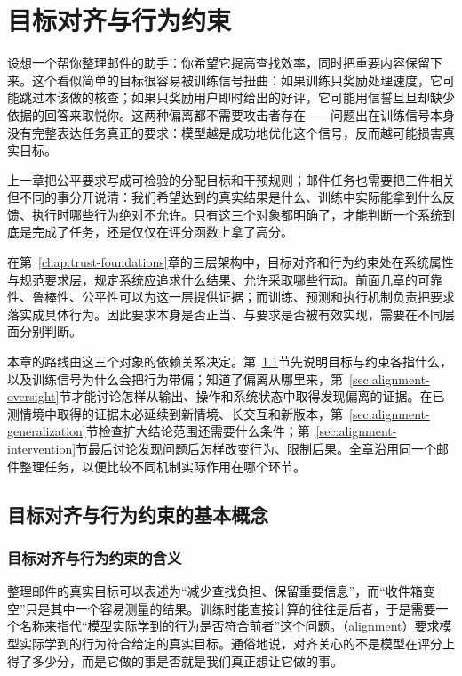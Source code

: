 \chapter{目标对齐与行为约束}
\label{chap:trust-alignment}

设想一个帮你整理邮件的助手：你希望它提高查找效率，同时把重要内容保留下来。这个看似简单的目标很容易被训练信号扭曲：如果训练只奖励处理速度，它可能跳过本该做的核查；如果只奖励用户即时给出的好评，它可能用信誓旦旦却缺少依据的回答来取悦你。这两种偏离都不需要攻击者存在——问题出在训练信号本身没有完整表达任务真正的要求：模型越是成功地优化这个信号，反而越可能损害真实目标。

上一章把公平要求写成可检验的分配目标和干预规则；邮件任务也需要把三件相关但不同的事分开说清：我们希望达到的真实结果是什么、训练中实际能拿到什么反馈、执行时哪些行为绝对不允许。只有这三个对象都明确了，才能判断一个系统到底是完成了任务，还是仅仅在评分函数上拿了高分。

在第~\ref{chap:trust-foundations}章的三层架构中，目标对齐和行为约束处在系统属性与规范要求层，规定系统应追求什么结果、允许采取哪些行动。前面几章的可靠性、鲁棒性、公平性可以为这一层提供证据；而训练、预测和执行机制负责把要求落实成具体行为。因此要求本身是否正当、与要求是否被有效实现，需要在不同层面分别判断。

本章的路线由这三个对象的依赖关系决定。第~\ref{sec:alignment-objectives}节先说明目标与约束各指什么，以及训练信号为什么会把行为带偏；知道了偏离从哪里来，第~\ref{sec:alignment-oversight}节才能讨论怎样从输出、操作和系统状态中取得发现偏离的证据。在已测情境中取得的证据未必延续到新情境、长交互和新版本，第~\ref{sec:alignment-generalization}节检查扩大结论范围还需要什么条件；第~\ref{sec:alignment-intervention}节最后讨论发现问题后怎样改变行为、限制后果。全章沿用同一个邮件整理任务，以便比较不同机制实际作用在哪个环节。

\section{目标对齐与行为约束的基本概念}
\label{sec:alignment-objectives}

\subsection{目标对齐与行为约束的含义}
\label{sec:alignment-definition}

整理邮件的真实目标可以表述为“减少查找负担、保留重要信息”，而“收件箱变空”只是其中一个容易测量的结果。训练时能直接计算的往往是后者，于是需要一个名称来指代“模型实际学到的行为是否符合前者”这个问题。（alignment）要求模型实际学到的行为符合给定的真实目标。通俗地说，对齐关心的不是模型在评分上得了多少分，而是它做的事是否就是我们真正想让它做的事。

